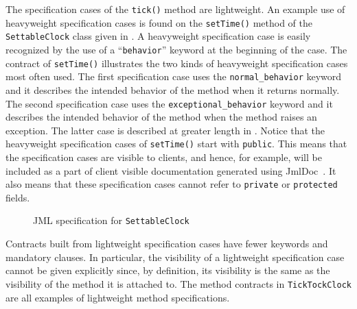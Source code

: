 \documentclass{llncs}
\begin{document}
The specification cases of the \texttt{tick()} method are lightweight.
%
%
An example use of heavyweight specification cases is found on the
\texttt{setTime()} method of the \texttt{SettableClock} class given in
.
%
A heavyweight specification case is easily recognized by the use of a
``\texttt{behavior}'' keyword at the beginning of the case.
%
The contract of \texttt{setTime()} illustrates the two kinds of heavyweight
specification cases most often used.
%
The first specification case uses the \texttt{normal\_behavior} keyword and it
describes the intended behavior of the method when it returns normally.
%
%
The second specification case uses the \texttt{exceptional\_behavior} keyword and it
describes the intended behavior of the method when the method raises an exception.
%
The latter case is described at greater length in .
Notice that the heavyweight specification cases of \texttt{setTime()} start
with \texttt{public}.
%
%
This means that the specification cases are visible to clients, and hence, for
example, will be included as a part of client visible documentation generated
using JmlDoc~\cite{STTT05}. It also means that these specification cases cannot
refer to \texttt{private} or \texttt{protected} fields.

\begin{figure}[tbp]
%
%
\vspace*{-2ex} %
\caption{JML specification for \texttt{SettableClock}}
\label{Example:SettableClock}
\end{figure}
%
%
Contracts built from lightweight specification cases have fewer keywords and
mandatory clauses.  In particular, the visibility of a lightweight
specification case cannot be given explicitly since, by definition, its
visibility is the same as 
the visibility of the method it is attached to.
%
The method contracts in \texttt{TickTockClock} are all examples of 
lightweight method specifications.

\end{document}
